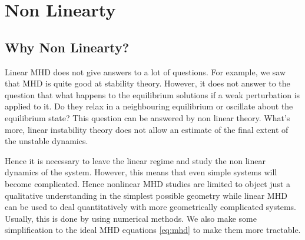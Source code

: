 \documentclass[12pt]{article}
\newenvironment{changemargin}[2]{
\begin{list}{}{
\setlength{\topsep}{0pt}
\setlength{\leftmargin}{#1}
\setlength{\rightmargin}{#2}
\setlength{\listparindent}{\parindent}
\setlength{\itemindent}{\parindent}
\setlength{\parsep}{\parskip}
}
\item[]}{\end{list}}
\begin{document}
\begin{changemargin}{-2cm}{-2cm}
    \section{Non Linearty}
    \subsection{Why Non Linearty?}
    Linear MHD does not give answers to a lot of questions. For example, we saw that MHD is quite good at stability theory. However, it does not answer to the question that what happens to the equilibrium solutions if a weak perturbation is applied to it. Do they relax in a neighbouring equilibrium or oscillate about the equilibrium state? This question can be answered by non linear theory. What's more, linear instability theory does not allow an estimate of the final extent of the unstable dynamics.

    Hence it is necessary to leave the linear regime and study the non linear dynamics of the system. However, this means that even simple systems will become complicated. Hence nonlinear MHD studies are limited to object just a qualitative understanding in the simplest possible geometry while linear MHD can be used to deal quantitatively with more geometrically complicated systems. Usually, this is done by using numerical methods. We also make some simplification to the ideal MHD equations \ref{eq:mhd} to make them more tractable.\cite{nonlinear-mhd-book}


\end{changemargin}
\end{document}
